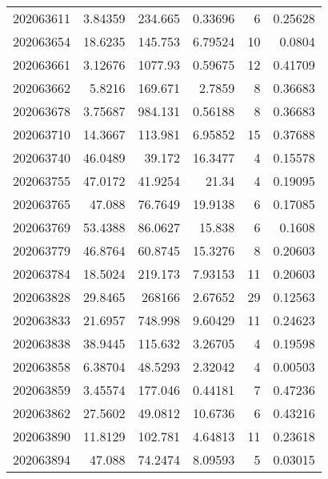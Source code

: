 \begin{tabular}{rrrrrr}
 202063611 &          3.84359 &      234.665  &            0.33696 &           6 & 0.25628 \\
 202063654 &         18.6235  &      145.753  &            6.79524 &          10 & 0.0804  \\
 202063661 &          3.12676 &     1077.93   &            0.59675 &          12 & 0.41709 \\
 202063662 &          5.8216  &      169.671  &            2.7859  &           8 & 0.36683 \\
 202063678 &          3.75687 &      984.131  &            0.56188 &           8 & 0.36683 \\
 202063710 &         14.3667  &      113.981  &            6.95852 &          15 & 0.37688 \\
 202063740 &         46.0489  &       39.172  &           16.3477  &           4 & 0.15578 \\
 202063755 &         47.0172  &       41.9254 &           21.34    &           4 & 0.19095 \\
 202063765 &         47.088   &       76.7649 &           19.9138  &           6 & 0.17085 \\
 202063769 &         53.4388  &       86.0627 &           15.838   &           6 & 0.1608  \\
 202063779 &         46.8764  &       60.8745 &           15.3276  &           8 & 0.20603 \\
 202063784 &         18.5024  &      219.173  &            7.93153 &          11 & 0.20603 \\
 202063828 &         29.8465  &   268166      &            2.67652 &          29 & 0.12563 \\
 202063833 &         21.6957  &      748.998  &            9.60429 &          11 & 0.24623 \\
 202063838 &         38.9445  &      115.632  &            3.26705 &           4 & 0.19598 \\
 202063858 &          6.38704 &       48.5293 &            2.32042 &           4 & 0.00503 \\
 202063859 &          3.45574 &      177.046  &            0.44181 &           7 & 0.47236 \\
 202063862 &         27.5602  &       49.0812 &           10.6736  &           6 & 0.43216 \\
 202063890 &         11.8129  &      102.781  &            4.64813 &          11 & 0.23618 \\
 202063894 &         47.088   &       74.2474 &            8.09593 &           5 & 0.03015 \\

\end{tabular}
